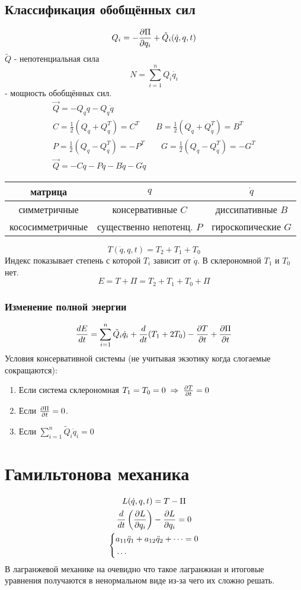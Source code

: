 \documentclass{article}
\begin{document}
\subsection{Классификация обобщённых сил}
\[
  Q_i=-\frac{\partial{\Pi}}{\partial{q_i}}+\tilde Q_i(\dot{q},q,t)
\]
$\tilde Q$ - непотенциальная сила
\[
  N=\sum_{i=1}^{n}Q_i\dot{q_i}
\]
- мощность обобщённых сил.
  \begin{gather*}
    \vec{Q}=-Q_qq-Q_{\dot{q}}\dot{q} \\ 
    C=\frac{1}{2}(Q_q+Q_q^{T})=C^{T} \qquad B=\frac{1}{2}(Q_{\dot{q}}+Q_{\dot{q}}^{T})=B^{T} \\
    P=\frac{1}{2}(Q_q-Q_q^{T})=-P^{T}  \qquad G=\frac{1}{2}(Q_{\dot{q}}-Q_{\dot{q}}^{T})=-G^{T} \\
    \vec{Q}=-Cq-Pq-B\dot{q}-G\dot{q}
  \end{gather*}
\begin{center}
\begin{tabular}{| c | c | c |}
  \hline
  матрица & $q$ & $\dot{q}$ \\ 
  \hline
  симметричные & консервативные $C$ & диссипативные $B$ \\ 
  \hline
  кососимметричные & существенно непотенц. $P$ & гироскопические $G$ \\
  \hline
\end{tabular}
\end{center}
\[
  T(\dot{q},q,t)=T_2+T_1+T_0
\]
Индекс показывает степень с которой $T_i$ зависит от $\dot{q}$. В склерономной 
$T_1$ и $T_0$ нет.
\[
  E=T+\Pi=T_2+T_1+T_0+\Pi
\]
\subsubsection{Изменение полной энергии}
\[
  \frac{dE}{dt}=\sum_{i=1}^{n}\tilde Q_i \dot{q}_i + \frac{d}{dt}(T_1+2T_0)-\frac{\partial{T}}{\partial{t}}+\frac{\partial{\Pi}}{\partial{t}}
\]
Условия консервативной системы (не учитывая экзотику когда слогаемые сокращаются):
\begin{enumerate}
  \item Если система склерономная $T_1=T_0=0 \; \Rightarrow \; \frac{\partial{T}}{\partial{t}}=0$
  \item Если $\frac{\partial{\Pi}}{\partial{t}}=0$.
  \item Если $\sum_{i=1}^{n}\tilde Q_i \dot{q}_i=0$
\end{enumerate}
\section{Гамильтонова механика}
\begin{gather*}
  L(\dot{q},q,t)=T-\Pi \\ 
  \frac{d}{dt}\left(\frac{\partial{L}}{\partial{q_i}}\right)-\frac{\partial{L}}{\partial{q_i}}=0 \\ 
  \left\{\begin{aligned}
      & a_{11}\ddot{q}_1 + a_{12}\ddot{q}_2 + \dots =0 \\ 
      & \dots 
  \end{aligned}\right.
\end{gather*}
В лагранжевой механике на очевидно что такое лагранжиан и итоговые
уравнения получаются в ненормальном виде из-за чего их сложно решать.
\end{document}
